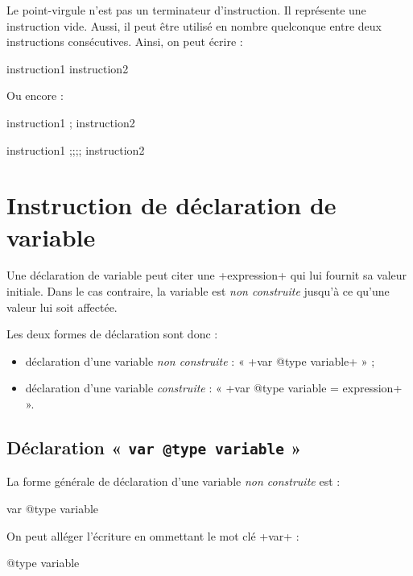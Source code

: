 Le point-virgule n'est pas un terminateur d'instruction. Il représente une instruction vide. Aussi, il peut être utilisé en nombre quelconque entre deux instructions consécutives. Ainsi, on peut écrire :

\begin{galgas}
instruction1  instruction2
\end{galgas}

Ou encore :
\begin{galgas}
instruction1 ; instruction2
\end{galgas}
\begin{galgas}
instruction1 ;;;; instruction2
\end{galgas}







\section{Instruction de déclaration de variable}


Une déclaration de variable peut citer une \ggs+expression+ qui lui fournit sa valeur initiale. Dans le cas contraire, la variable est \emph{non construite} jusqu'à ce qu'une valeur lui soit affectée.

Les deux formes de déclaration sont donc :
\begin{itemize}
\item déclaration d'une variable \emph{non construite} : « \ggs+var @type variable+ » ;
\item déclaration d'une variable \emph{construite} : « \ggs+var @type variable = expression+ ».
\end{itemize}


\subsection{Déclaration « \texttt{var @type variable} »}

La forme générale de déclaration d'une variable \emph{non construite} est :
\begin{galgasbox}
var @type variable
\end{galgasbox}


On peut alléger l'écriture en ommettant le mot clé \ggs+var+ :
\begin{galgasbox}
@type variable
\end{galgasbox}





